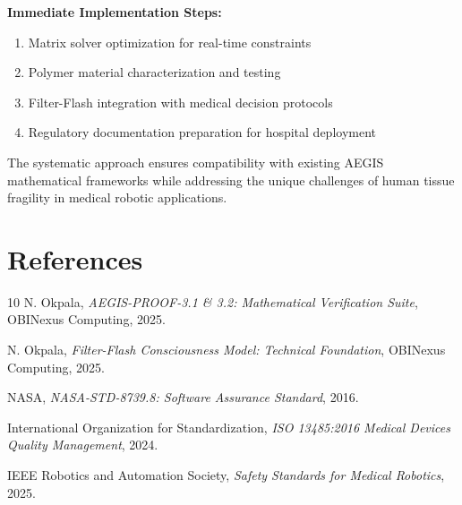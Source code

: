 \documentclass[11pt]{article}
\begin{document}
\textbf{Immediate Implementation Steps:}
\begin{enumerate}
\item Matrix solver optimization for real-time constraints
\item Polymer material characterization and testing
\item Filter-Flash integration with medical decision protocols
\item Regulatory documentation preparation for hospital deployment
\end{enumerate}

The systematic approach ensures compatibility with existing AEGIS mathematical frameworks while addressing the unique challenges of human tissue fragility in medical robotic applications.

\section{References}

\begin{thebibliography}{10}
 N. Okpala, \textit{AEGIS-PROOF-3.1 \& 3.2: Mathematical Verification Suite}, OBINexus Computing, 2025.

 N. Okpala, \textit{Filter-Flash Consciousness Model: Technical Foundation}, OBINexus Computing, 2025.

 NASA, \textit{NASA-STD-8739.8: Software Assurance Standard}, 2016.

 International Organization for Standardization, \textit{ISO 13485:2016 Medical Devices Quality Management}, 2024.

 IEEE Robotics and Automation Society, \textit{Safety Standards for Medical Robotics}, 2025.
\end{thebibliography}
\end{document}
